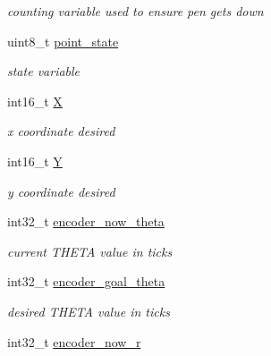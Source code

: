 \begin{DoxyCompactItemize}
\begin{DoxyCompactList}\small\item\em counting variable used to ensure pen gets down \end{DoxyCompactList}\item 
\hypertarget{classpoint_a58298128ea4c549b57d6f30b7b2cfb3a}{uint8\-\_\-t \hyperlink{classpoint_a58298128ea4c549b57d6f30b7b2cfb3a}{point\-\_\-state}}\label{classpoint_a58298128ea4c549b57d6f30b7b2cfb3a}

\begin{DoxyCompactList}\small\item\em state variable \end{DoxyCompactList}\item 
\hypertarget{classpoint_a7edf6fd0ef74253e370ec22af74405e6}{int16\-\_\-t \hyperlink{classpoint_a7edf6fd0ef74253e370ec22af74405e6}{X}}\label{classpoint_a7edf6fd0ef74253e370ec22af74405e6}

\begin{DoxyCompactList}\small\item\em x coordinate desired \end{DoxyCompactList}\item 
\hypertarget{classpoint_a19664086f26b511951e44a0a7047620e}{int16\-\_\-t \hyperlink{classpoint_a19664086f26b511951e44a0a7047620e}{Y}}\label{classpoint_a19664086f26b511951e44a0a7047620e}

\begin{DoxyCompactList}\small\item\em y coordinate desired \end{DoxyCompactList}\item 
\hypertarget{classpoint_a86689becd53e88b9cbf5a753538d01fd}{int32\-\_\-t \hyperlink{classpoint_a86689becd53e88b9cbf5a753538d01fd}{encoder\-\_\-now\-\_\-theta}}\label{classpoint_a86689becd53e88b9cbf5a753538d01fd}

\begin{DoxyCompactList}\small\item\em current T\-H\-E\-T\-A value in ticks \end{DoxyCompactList}\item 
\hypertarget{classpoint_a220965afba5b943647be961d3143da6f}{int32\-\_\-t \hyperlink{classpoint_a220965afba5b943647be961d3143da6f}{encoder\-\_\-goal\-\_\-theta}}\label{classpoint_a220965afba5b943647be961d3143da6f}

\begin{DoxyCompactList}\small\item\em desired T\-H\-E\-T\-A value in ticks \end{DoxyCompactList}\item 
\hypertarget{classpoint_a376d5c50a90d08b3b995c192659105c1}{int32\-\_\-t \hyperlink{classpoint_a376d5c50a90d08b3b995c192659105c1}{encoder\-\_\-now\-\_\-r}}\label{classpoint_a376d5c50a90d08b3b995c192659105c1}


\end{DoxyCompactItemize}
